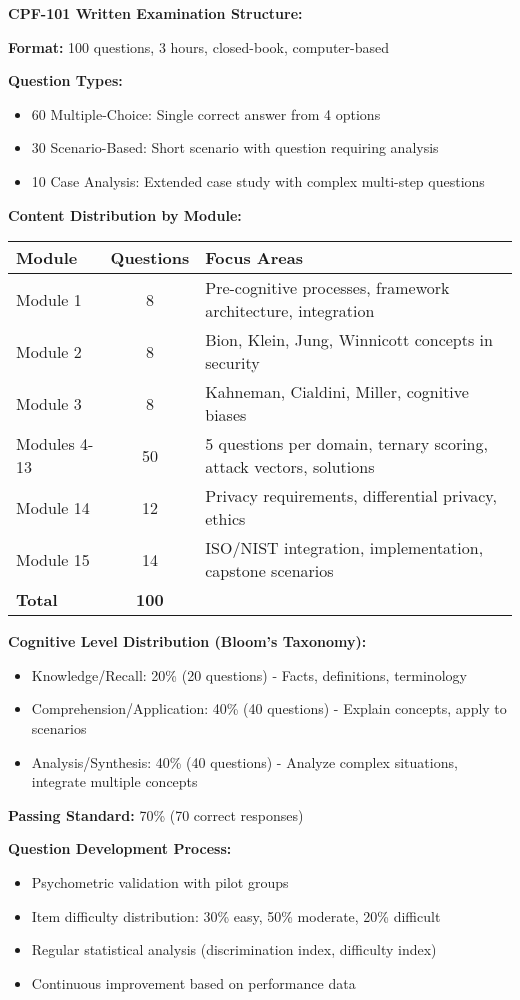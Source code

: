 \documentclass[11pt,a4paper]{article}
\begin{document}
\textbf{CPF-101 Written Examination Structure:}

\textbf{Format:} 100 questions, 3 hours, closed-book, computer-based

\textbf{Question Types:}
\begin{itemize}
\item 60 Multiple-Choice: Single correct answer from 4 options
\item 30 Scenario-Based: Short scenario with question requiring analysis
\item 10 Case Analysis: Extended case study with complex multi-step questions
\end{itemize}

\textbf{Content Distribution by Module:}

\begin{tabular}{|l|c|p{6cm}|}
\hline
\textbf{Module} & \textbf{Questions} & \textbf{Focus Areas} \\
\hline
Module 1 & 8 & Pre-cognitive processes, framework architecture, integration \\
Module 2 & 8 & Bion, Klein, Jung, Winnicott concepts in security \\
Module 3 & 8 & Kahneman, Cialdini, Miller, cognitive biases \\
Modules 4-13 & 50 & 5 questions per domain, ternary scoring, attack vectors, solutions \\
Module 14 & 12 & Privacy requirements, differential privacy, ethics \\
Module 15 & 14 & ISO/NIST integration, implementation, capstone scenarios \\
\hline
\textbf{Total} & \textbf{100} & \\
\hline
\end{tabular}

\textbf{Cognitive Level Distribution (Bloom's Taxonomy):}
\begin{itemize}
\item Knowledge/Recall: 20\% (20 questions) - Facts, definitions, terminology
\item Comprehension/Application: 40\% (40 questions) - Explain concepts, apply to scenarios
\item Analysis/Synthesis: 40\% (40 questions) - Analyze complex situations, integrate multiple concepts
\end{itemize}

\textbf{Passing Standard:} 70\% (70 correct responses)

\textbf{Question Development Process:}
\begin{itemize}
\item Psychometric validation with pilot groups
\item Item difficulty distribution: 30\% easy, 50\% moderate, 20\% difficult
\item Regular statistical analysis (discrimination index, difficulty index)
\item Continuous improvement based on performance data
\end{itemize}
\end{document}
